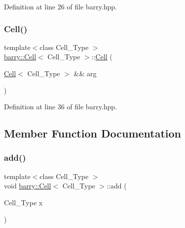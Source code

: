 Definition at line 26 of file barry.\+hpp.

\mbox{\label{classbarry_1_1_cell_a56d2ab8f2a26b1fd8f3b3b9bfef37c1b}} 
\subsubsection{\texorpdfstring{Cell()}{Cell()}\hspace{0.1cm}{\footnotesize\ttfamily [6/6]}}
{\footnotesize\ttfamily template$<$class Cell\+\_\+\+Type $>$ \\
\hyperlink{classbarry_1_1_cell}{barry\+::\+Cell}$<$ Cell\+\_\+\+Type $>$\+::\hyperlink{classbarry_1_1_cell}{Cell} (\begin{DoxyParamCaption}\item[{\hyperlink{classbarry_1_1_cell}{Cell}$<$ Cell\+\_\+\+Type $>$ \&\&}]{arg }\end{DoxyParamCaption})\hspace{0.3cm}{\ttfamily [inline]}}



Definition at line 36 of file barry.\+hpp.



\subsection{Member Function Documentation}
\mbox{\label{classbarry_1_1_cell_a40c9aad3ba2c9d5a1a91833c66522ad8}} 
\subsubsection{\texorpdfstring{add()}{add()}}
{\footnotesize\ttfamily template$<$class Cell\+\_\+\+Type $>$ \\
void \hyperlink{classbarry_1_1_cell}{barry\+::\+Cell}$<$ Cell\+\_\+\+Type $>$\+::add (\begin{DoxyParamCaption}\item[{Cell\+\_\+\+Type}]{x }\end{DoxyParamCaption})}

\mbox{\label{classbarry_1_1_cell_a2a23ba83119de9162b6e3b6a994f4b61}} 
